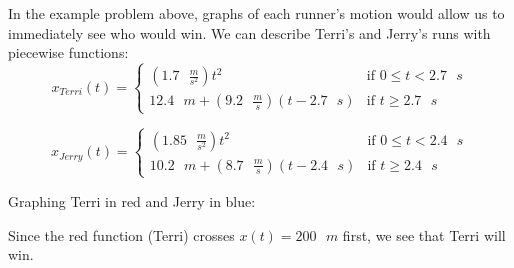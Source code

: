 
In the example problem above, graphs of each runner's motion would allow us to 
immediately see who would win. We can describe Terri's and Jerry's runs with 
piecewise functions:
$$x_{Terri}(t) = \begin{cases}
\left( 1.7 \text{ } \frac{m}{s^2} \right)t^2 & \text{if } 0 \leq t < 2.7 
\text{ }s\\
12.4 \text{ } m + \left( 9.2 \text{ } \frac{m}{s} \right) \left( t - 2.7 \text{ } 
s \right) & \text{if } t \geq 2.7 \text{ }s
\end{cases}$$

$$x_{Jerry}(t) = \begin{cases}
\left( 1.85 \text{ } \frac{m}{s^2} \right)t^2 & \text{if } 0 \leq t < 2.4 
\text{ }s\\
10.2 \text{ }m + \left( 8.7 \text{ }\frac{m}{s} \right) \left(t - 2.4 \text{ }s 
\right) & \text{if } t \geq 2.4 \text{ }s
\end{cases}$$

Graphing Terri in red and Jerry in blue:
\begin{center}
\end{center}

Since the red function (Terri) crosses $x(t) = 200 \text{ }m$ first, we see that 
Terri will win. 

